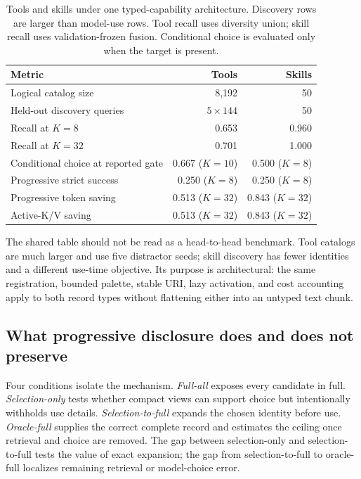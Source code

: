 \documentclass[11pt]{article}
\begin{document}
\begin{table}[t]
\centering
\small
\begin{tabular}{@{}lrr@{}}
\toprule
Metric & Tools & Skills \\
\midrule
Logical catalog size & 8,192 & 50 \\
Held-out discovery queries & $5\times144$ & 50 \\
Recall at $K=8$ & 0.653 & 0.960 \\
Recall at $K=32$ & 0.701 & 1.000 \\
Conditional choice at reported gate & 0.667 ($K=10$) & 0.500 ($K=8$) \\
Progressive strict success & 0.250 ($K=8$) & 0.250 ($K=8$) \\
Progressive token saving & 0.513 ($K=32$) & 0.843 ($K=32$) \\
Active-K/V saving & 0.513 ($K=32$) & 0.843 ($K=32$) \\
\bottomrule
\end{tabular}
\caption{Tools and skills under one typed-capability architecture. Discovery
rows are larger than model-use rows. Tool recall uses diversity union; skill
recall uses validation-frozen fusion. Conditional choice is evaluated only
when the target is present.}
\label{tab:capability-comparison}
\end{table}

The shared table should not be read as a head-to-head benchmark. Tool catalogs
are much larger and use five distractor seeds; skill discovery has fewer
identities and a different use-time objective. Its purpose is architectural:
the same registration, bounded palette, stable URI, lazy activation, and cost
accounting apply to both record types without flattening either into an
untyped text chunk.

\subsection{What progressive disclosure does and does not preserve}

Four conditions isolate the mechanism. \emph{Full-all} exposes every candidate
in full. \emph{Selection-only} tests whether compact views can support choice
but intentionally withholds use details. \emph{Selection-to-full} expands the
chosen identity before use. \emph{Oracle-full} supplies the correct complete
record and estimates the ceiling once retrieval and choice are removed. The
gap between selection-only and selection-to-full tests the value of exact
expansion; the gap from selection-to-full to oracle-full localizes remaining
retrieval or model-choice error.
\end{document}

